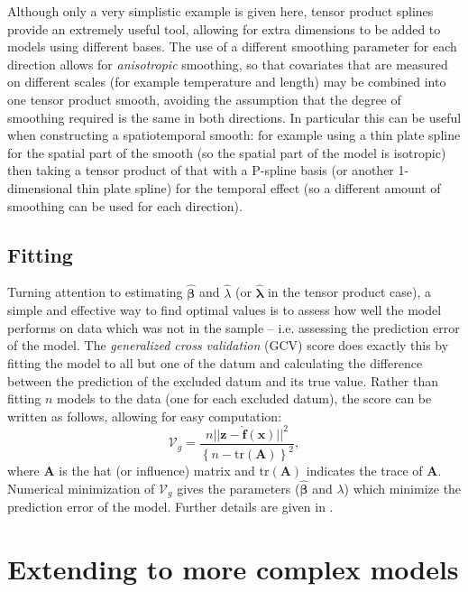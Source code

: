 Although only a very simplistic example is given here, tensor product splines provide an extremely useful tool, allowing for extra dimensions to be added to models using different bases. The use of a different smoothing parameter for each direction allows for \textit{anisotropic} smoothing, so that covariates that are measured on different scales (for example temperature and length) may be combined into one tensor product smooth, avoiding the assumption that the degree of smoothing required is the same in both directions. In particular this can be useful when constructing a spatiotemporal smooth: for example using a thin plate spline for the spatial part of the smooth (so the spatial part of the model is isotropic) then taking a tensor product of that with a P-spline basis (or another 1-dimensional thin plate spline) for the temporal effect (so a different amount of smoothing can be used for each direction).

\subsection{Fitting}
\label{GAMfitting}

Turning attention to estimating $\bm{\hat{\beta}}$ and $\hat{\lambda}$ (or $\hat{\bm{\lambda}}$ in the tensor product case), a simple and effective way to find optimal values is to assess how well the model performs on data which was not in the sample -- i.e. assessing the prediction error of the model. The \textit{generalized cross validation} (GCV) score does exactly this by fitting the model to all but one of the datum and calculating the difference between the prediction of the excluded datum and its true value. Rather than fitting $n$ models to the data (one for each excluded datum), the score can be written as follows, allowing for easy computation:
\begin{equation}
\mathcal{V}_g = \frac{n \lvert\lvert \mathbf{z} - \mathbf{\hat{f}}(\mathbf{x})\rvert \rvert^2}{\left \{n-\text{tr}(\mathbf{A}) \right \}^2},
\label{intro-GCV}
\end{equation}
where $\mathbf{A}$ is the hat (or influence) matrix and $\text{tr}(\mathbf{A})$ indicates the trace of $\mathbf{A}$. Numerical minimization of $\mathcal{V}_g$ gives the parameters ($\bm{\hat{\beta}}$ and $\lambda$) which minimize the prediction error of the model. Further details are given in . 



\section{Extending to more complex models}
\label{intro-extending}

